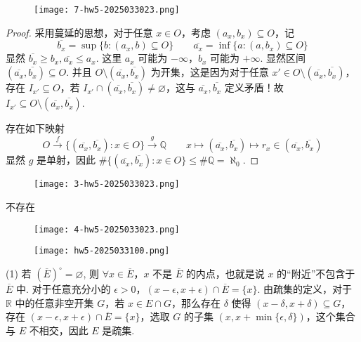 \begin{figure}[H]
\centering
\texttt{[image: 7-hw5-2025033023.png]}
\label{}
\end{figure}

\begin{proof}
采用蔓延的思想，对于任意 $x\in O$，考虑 $(a_{x},b_{x})\subseteq O$，记
\[
\overline{b_{x}}=\sup \{ b:(a_{x},b)\subseteq O \}\qquad \overline{a_{x}}=\inf \{ a:(a,b_{x})\subseteq O \}
\]
显然 $\overline{b_{x}}\geq b_{x},\overline{a_{x}}\leq a_{x}$. 这里 $a_{x}$ 可能为 $-\infty$，$b_{x}$ 可能为 $+\infty$. 显然区间 $(\overline{a_{x}},\overline{b_{x}})\subseteq O$. 并且 $O\setminus(\overline{a_{x}},\overline{b_{x}})$ 为开集，这是因为对于任意 $x'\in O\setminus(\overline{a_{x}},\overline{b_{x}})$，存在 $I_{x'}\subseteq O$，若 $I_{x'}\cap(\overline{a_{x}},\overline{b_{x}})\neq \varnothing$，这与 $\overline{a_{x}},\overline{b_{x}}$ 定义矛盾！故 $I_{x'}\subseteq O\setminus(\overline{a_{x}},\overline{b_{x}})$.

存在如下映射
\[
O\overset{ f }{ \to } \{ (\overline{a_{x}},\overline{b_{x}}):x\in O \}\overset{ g }{ \to } \mathbb{Q}\qquad x\mapsto(\overline{a_{x}},\overline{b_{x}})\mapsto r_{x}\in(\overline{a_{x}},\overline{b_{x}})
\]
显然 $g$ 是单射，因此 $\#\{ (\overline{a_{x}},\overline{b_{x}}):x\in O \}\leq\#\mathbb{Q}=\aleph_0$.
\end{proof}

\begin{figure}[H]
\centering
\texttt{[image: 3-hw5-2025033023.png]}
\label{}
\end{figure}

不存在

\begin{figure}[H]
\centering
\texttt{[image: 4-hw5-2025033023.png]}
\label{}
\end{figure}

\begin{figure}[H]
\centering
\texttt{[image: hw5-2025033100.png]}
\label{}
\end{figure}

(1) 若 $(\overline{E})^{\circ}=\varnothing$, 则 $\forall x\in \overline{E}$，$x$ 不是 $\overline{E}$ 的内点，也就是说 $x$ 的“附近”不包含于 $\overline{E}$ 中. 对于任意充分小的 $\epsilon>0$，$(x-\epsilon, x+\epsilon)\cap \overline{E}=\{ x \}$. 由疏集的定义，对于 $\mathbb{R}$ 中的任意非空开集 $G$，若 $x\in E\cap G$，那么存在 $\delta$ 使得 $(x-\delta,x+\delta)\subseteq G$，存在 $(x-\epsilon,x+\epsilon)\cap \overline{E}=\{ x \}$，选取 $G$ 的子集 $(x,x+\min\{ \epsilon,\delta \})$，这个集合与 $E$ 不相交，因此 $E$ 是疏集.

